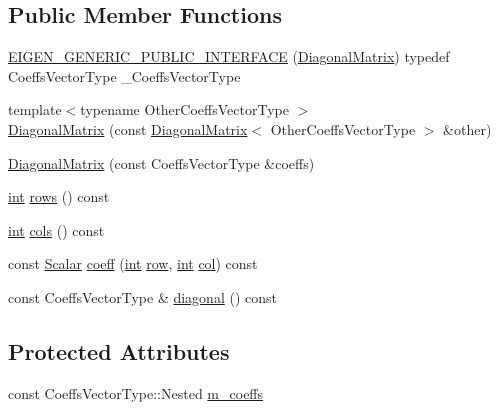 \subsection*{Public Member Functions}
\begin{DoxyCompactItemize}
\item 
\hyperlink{class_diagonal_matrix_af250ecc32507decf18145525f67feb83}{E\-I\-G\-E\-N\-\_\-\-G\-E\-N\-E\-R\-I\-C\-\_\-\-P\-U\-B\-L\-I\-C\-\_\-\-I\-N\-T\-E\-R\-F\-A\-C\-E} (\hyperlink{class_diagonal_matrix}{Diagonal\-Matrix}) typedef Coeffs\-Vector\-Type \-\_\-\-Coeffs\-Vector\-Type
\item 
{\footnotesize template$<$typename Other\-Coeffs\-Vector\-Type $>$ }\\\hyperlink{class_diagonal_matrix_a248cf244bc551dee2b100ace7dcea44d}{Diagonal\-Matrix} (const \hyperlink{class_diagonal_matrix}{Diagonal\-Matrix}$<$ Other\-Coeffs\-Vector\-Type $>$ \&other)
\item 
\hyperlink{class_diagonal_matrix_a1e527a4f4cb431060ec4239152d8d7bd}{Diagonal\-Matrix} (const Coeffs\-Vector\-Type \&coeffs)
\item 
\hyperlink{ioapi_8h_a787fa3cf048117ba7123753c1e74fcd6}{int} \hyperlink{class_diagonal_matrix_afe577786bfde3a2bc52a5721b0eeaa8c}{rows} () const 
\item 
\hyperlink{ioapi_8h_a787fa3cf048117ba7123753c1e74fcd6}{int} \hyperlink{class_diagonal_matrix_ad37c28a8856b9dc2adcfac8bb559e251}{cols} () const 
\item 
const \hyperlink{class_matrix_base_a625df8339dc2d816cbc0fd66e7dadaf5}{Scalar} \hyperlink{class_diagonal_matrix_a9408380c29583dd7741236b94c3f5b26}{coeff} (\hyperlink{ioapi_8h_a787fa3cf048117ba7123753c1e74fcd6}{int} \hyperlink{glext_8h_a11b277b422822f784ee248b43eee3e1e}{row}, \hyperlink{ioapi_8h_a787fa3cf048117ba7123753c1e74fcd6}{int} \hyperlink{class_matrix_base_ae3c94b0f25b4273c7a8125169bdf60e0}{col}) const 
\item 
const Coeffs\-Vector\-Type \& \hyperlink{class_diagonal_matrix_abd84fa9557bceaae474a51a50dbd6497}{diagonal} () const 
\end{DoxyCompactItemize}
\subsection*{Protected Attributes}
\begin{DoxyCompactItemize}
\item 
const Coeffs\-Vector\-Type\-::\-Nested \hyperlink{class_diagonal_matrix_a07b32cceb0f016ecc3a0dbf6dcbc4132}{m\-\_\-coeffs}
\end{DoxyCompactItemize}
